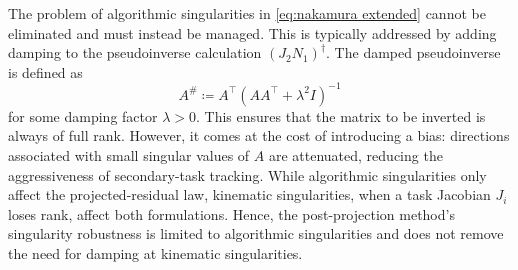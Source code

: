 \documentclass[../main.tex]{subfiles}
\begin{document}
The problem of algorithmic singularities in \eqref{eq:nakamura extended} cannot be eliminated and must instead be managed. This is typically addressed by adding damping to the pseudoinverse calculation \( (J_2 N_1)^\dagger \). The damped pseudoinverse is defined as
\begin{equation}
    \label{eq:pinv_damped}
     A^\# \coloneqq A^\top (AA^\top + \lambda^2 I)^{-1}
\end{equation}
for some damping factor \( \lambda > 0 \). This ensures that the matrix to be inverted is always of full rank. However, it comes at the cost of introducing a bias: directions associated with small singular values of \( A \) are attenuated, reducing the aggressiveness of secondary-task tracking. While algorithmic singularities only affect the projected-residual law, kinematic singularities, when a task Jacobian \( J_i \) loses rank, affect both formulations. Hence, the post-projection method's singularity robustness is limited to algorithmic singularities and does not remove the need for damping at kinematic singularities. 



\end{document}
